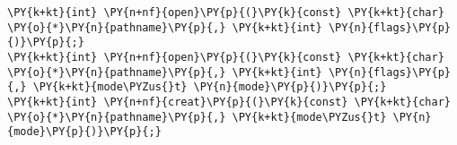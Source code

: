 \begin{Verbatim}[commandchars=\\\{\}]
\PY{k+kt}{int} \PY{n+nf}{open}\PY{p}{(}\PY{k}{const} \PY{k+kt}{char} \PY{o}{*}\PY{n}{pathname}\PY{p}{,} \PY{k+kt}{int} \PY{n}{flags}\PY{p}{)}\PY{p}{;}
\PY{k+kt}{int} \PY{n+nf}{open}\PY{p}{(}\PY{k}{const} \PY{k+kt}{char} \PY{o}{*}\PY{n}{pathname}\PY{p}{,} \PY{k+kt}{int} \PY{n}{flags}\PY{p}{,} \PY{k+kt}{mode\PYZus{}t} \PY{n}{mode}\PY{p}{)}\PY{p}{;}
\PY{k+kt}{int} \PY{n+nf}{creat}\PY{p}{(}\PY{k}{const} \PY{k+kt}{char} \PY{o}{*}\PY{n}{pathname}\PY{p}{,} \PY{k+kt}{mode\PYZus{}t} \PY{n}{mode}\PY{p}{)}\PY{p}{;}
\end{Verbatim}
